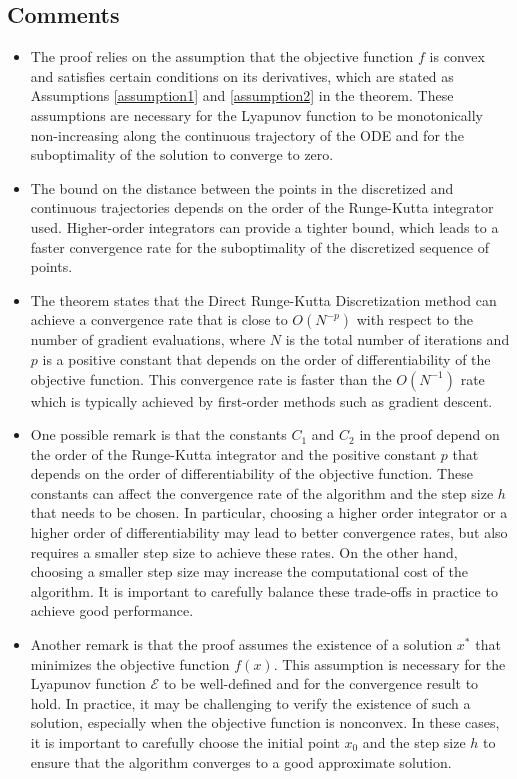 \subsection{Comments}
\begin{itemize}
    \item The proof relies on the assumption that the objective function $f$ is convex and satisfies certain conditions on its derivatives, which are stated as Assumptions \ref{assumption1} and \ref{assumption2} in the theorem. These assumptions are necessary for the Lyapunov function to be monotonically non-increasing along the continuous trajectory of the ODE and for the suboptimality of the solution to converge to zero.

    \item The bound on the distance between the points in the discretized and continuous trajectories depends on the order of the Runge-Kutta integrator used. Higher-order integrators can provide a tighter bound, which leads to a faster convergence rate for the suboptimality of the discretized sequence of points.

    \item The theorem states that the Direct Runge-Kutta Discretization method can achieve a convergence rate that is close to $O(N^{-p})$ with respect to the number of gradient evaluations, where $N$ is the total number of iterations and $p$ is a positive constant that depends on the order of differentiability of the objective function. This convergence rate is faster than the $O(N^{-1})$ rate which is typically achieved by first-order methods such as gradient descent.

    \item One possible remark is that the constants $C_1$ and $C_2$ in the proof depend on the order of the Runge-Kutta integrator and the positive constant $p$ that depends on the order of differentiability of the objective function. These constants can affect the convergence rate of the algorithm and the step size $h$ that needs to be chosen. In particular, choosing a higher order integrator or a higher order of differentiability may lead to better convergence rates, but also requires a smaller step size to achieve these rates. On the other hand, choosing a smaller step size may increase the computational cost of the algorithm. It is important to carefully balance these trade-offs in practice to achieve good performance.

    \item Another remark is that the proof assumes the existence of a solution $x^*$ that minimizes the objective function $f(x)$. This assumption is necessary for the Lyapunov function $\mathcal{E}$ to be well-defined and for the convergence result to hold. In practice, it may be challenging to verify the existence of such a solution, especially when the objective function is nonconvex. In these cases, it is important to carefully choose the initial point $x_0$ and the step size $h$ to ensure that the algorithm converges to a good approximate solution.


\end{itemize}

